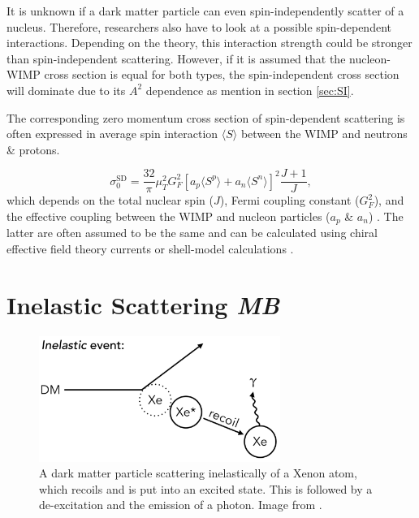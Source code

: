 \documentclass{article}
\begin{document}
It is unknown if a dark matter particle can even spin-independently scatter of a nucleus. Therefore, researchers also have to look at a possible spin-dependent interactions. Depending on the theory, this interaction strength could be stronger than spin-independent scattering. However, if it is assumed that the nucleon-WIMP cross section is equal for both types, the spin-independent cross section will dominate due to its $A^2$ dependence as mention in section \ref{sec:SI}.

The corresponding zero momentum cross section of spin-dependent scattering is often expressed in average spin interaction $\langle S \rangle$ between the WIMP and neutrons \& protons. 

\begin{equation}
    \sigma^\text{SD}_0 = \frac{32}{\pi} \mu^2_T G^2_F \left[a_p \langle S^p \rangle + a_n \langle S^n \rangle \right]^2 \frac{J+1}{J}, 
\end{equation}
which depends on the total nuclear spin ($J$), Fermi coupling constant ($G_F^2$), and the effective coupling between the WIMP and nucleon particles ($a_p$ \& $a_n$) \cite{Undagoitia:2015gya}. The latter are often assumed to be the same \cite{Kavanagh:2014rya} and can be  calculated using chiral effective field theory currents \cite{Klos:2013rwa} or shell-model calculations \cite{Toivanen:2009zza}. 


\FloatBarrier
\newpage

\section{Inelastic Scattering \small{\textit{MB}}}
\label{sec:inelastic}

\begin{figure}[h]
    \centering
    \includegraphics[width=0.7\textwidth]{Inelastic_Scattering.png}
    \caption{A dark matter particle scattering inelastically of a Xenon atom, which recoils and is put into an excited state. This is followed by a de-excitation and the emission of a photon. Image from \cite{McCabe:2015eia}.}
    \label{inelastic}
\end{figure}
\end{document}
